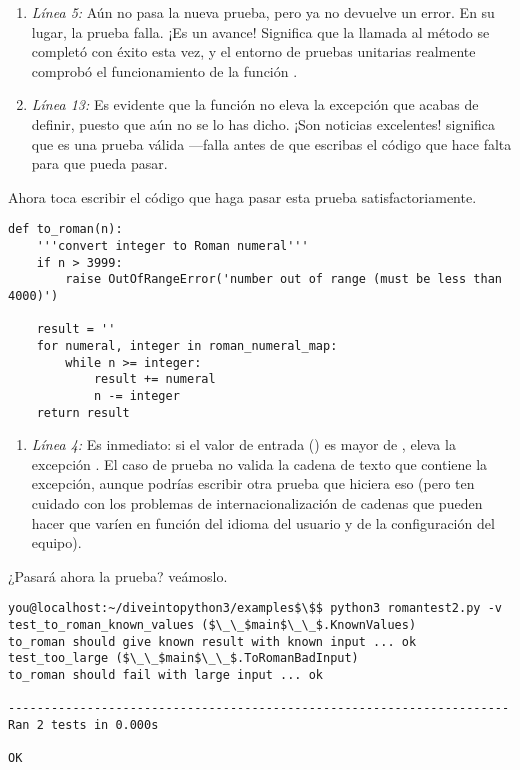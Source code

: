 \begin{enumerate}

\item \emph{Línea 5:} Aún no pasa la nueva prueba, pero ya no devuelve un error. En su lugar, la prueba falla. ¡Es un avance! Significa que la llamada al método  se completó con éxito esta vez, y el entorno de pruebas unitarias realmente comprobó el funcionamiento de la función .

\item \emph{Línea 13:} Es evidente que la función  no eleva la excepción  que acabas de definir, puesto que aún no se lo has dicho. ¡Son noticias excelentes! significa que es una prueba válida ---falla antes de que escribas el código que hace falta para que pueda pasar.

\end{enumerate}

Ahora toca escribir el código que haga pasar esta prueba satisfactoriamente.

\noindent\begin{minipage}{\textwidth}
\begin{lstlisting}[mathescape=True]
def to_roman(n):
    '''convert integer to Roman numeral'''
    if n > 3999:
        raise OutOfRangeError('number out of range (must be less than 4000)')

    result = ''
    for numeral, integer in roman_numeral_map:
        while n >= integer:
            result += numeral
            n -= integer
    return result
\end{lstlisting}
\end{minipage}

\begin{enumerate}

\item \emph{Línea 4:} Es inmediato: si el valor de entrada () es mayor de , eleva la excepción . El caso de prueba no valida la cadena de texto que contiene la excepción, aunque podrías escribir otra prueba que hiciera eso (pero ten cuidado con los problemas de internacionalización de cadenas que pueden hacer que varíen en función del idioma del usuario y de la configuración del equipo).

\end{enumerate}

¿Pasará ahora la prueba? veámoslo.

\noindent\begin{minipage}{\textwidth}
\begin{lstlisting}[mathescape=True]
you@localhost:~/diveintopython3/examples$\$$ python3 romantest2.py -v
test_to_roman_known_values ($\_\_$main$\_\_$.KnownValues)
to_roman should give known result with known input ... ok
test_too_large ($\_\_$main$\_\_$.ToRomanBadInput)
to_roman should fail with large input ... ok 

----------------------------------------------------------------------
Ran 2 tests in 0.000s

OK
\end{lstlisting}
\end{minipage}

